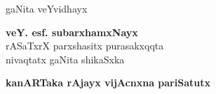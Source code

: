 \thispagestyle{empty}
\begin{center}
{\fontsize{30}{32}\selectfont gaNita veYvidhayx}
\vfill


{\LARGE\bfseries veY. esf. subarxhamxNayx}\\[4pt]
{\large rASaTxrX parxshasitx purasakxqqta\\[4pt]
nivaqtatx gaNita shikaSxka}
\vfill

{\Large\bfseries kanARTaka rAjayx vijAcnxna pariSatutx}





\end{center}
